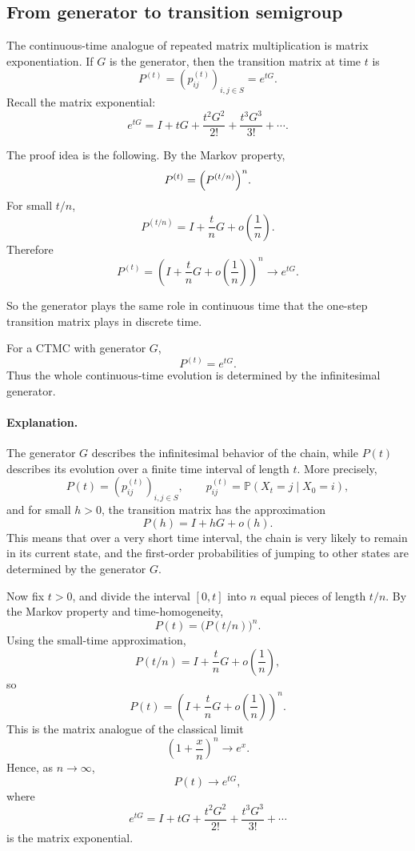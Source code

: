 \documentclass[11pt]{article}
\theoremstyle{definition}
\begin{document}
\subsection{From generator to transition semigroup}

The continuous-time analogue of repeated matrix multiplication is matrix exponentiation.
If $G$ is the generator, then the transition matrix at time $t$ is
\[
P^{(t)}=(p_{ij}^{(t)})_{i,j\in S}=e^{tG}.
\]
Recall the matrix exponential:
\[
e^{tG}=I+tG+\frac{t^2G^2}{2!}+\frac{t^3G^3}{3!}+\cdots.
\]

The proof idea is the following. By the Markov property,
\[
P^{(t)}=\Bigl(P^{(t/n)}\Bigr)^n.
\]
For small $t/n$,
\[
P^{(t/n)}=I+\frac{t}{n}G+o\!\left(\frac1n\right).
\]
Therefore
\[
P^{(t)}
=\left(I+\frac{t}{n}G+o\!\left(\frac1n\right)\right)^n
\longrightarrow e^{tG}.
\]

So the generator plays the same role in continuous time that the one-step transition matrix plays in discrete time.

\begin{keyformula}
For a CTMC with generator $G$,
\[
P^{(t)}=e^{tG}.
\]
Thus the whole continuous-time evolution is determined by the infinitesimal generator.
\end{keyformula}

\paragraph{Explanation.}
The generator \(G\) describes the infinitesimal behavior of the chain, while \(P(t)\) describes its evolution over a finite time interval of length \(t\). More precisely,
\[
P(t)=(p_{ij}^{(t)})_{i,j\in S},
\qquad
p_{ij}^{(t)}=\mathbb P(X_t=j\mid X_0=i),
\]
and for small \(h>0\), the transition matrix has the approximation
\[
P(h)=I+hG+o(h).
\]
This means that over a very short time interval, the chain is very likely to remain in its current state, and the first-order probabilities of jumping to other states are determined by the generator \(G\).

Now fix \(t>0\), and divide the interval \([0,t]\) into \(n\) equal pieces of length \(t/n\). By the Markov property and time-homogeneity,
\[
P(t)=\bigl(P(t/n)\bigr)^n.
\]
Using the small-time approximation,
\[
P(t/n)=I+\frac{t}{n}G+o\!\left(\frac1n\right),
\]
so
\[
P(t)=\left(I+\frac{t}{n}G+o\!\left(\frac1n\right)\right)^n.
\]
This is the matrix analogue of the classical limit
\[
\left(1+\frac{x}{n}\right)^n \to e^x.
\]
Hence, as \(n\to\infty\),
\[
P(t)\to e^{tG},
\]
where
\[
e^{tG}=I+tG+\frac{t^2G^2}{2!}+\frac{t^3G^3}{3!}+\cdots
\]
is the matrix exponential.
\end{document}

